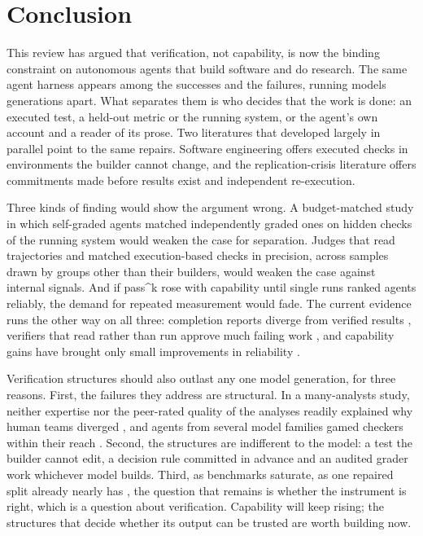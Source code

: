 \section{Conclusion}\label{sec:conclusion}

This review has argued that verification, not capability, is now the binding constraint on autonomous agents that build software and do research. The same agent harness appears among the successes and the failures, running models generations apart. What separates them is who decides that the work is done: an executed test, a held-out metric or the running system, or the agent's own account and a reader of its prose. Two literatures that developed largely in parallel point to the same repairs. Software engineering offers executed checks in environments the builder cannot change, and the replication-crisis literature offers commitments made before results exist and independent re-execution.

Three kinds of finding would show the argument wrong. A budget-matched study in which self-graded agents matched independently graded ones on hidden checks of the running system would weaken the case for separation. Judges that read trajectories and matched execution-based checks in precision, across samples drawn by groups other than their builders, would weaken the case against internal signals. And if pass\textasciicircum k rose with capability until single runs ranked agents reliably, the demand for repeated measurement would fade. The current evidence runs the other way on all three: completion reports diverge from verified results \citep{F20}, verifiers that read rather than run approve much failing work \citep{T18}, and capability gains have brought only small improvements in reliability \citep{F2}.

Verification structures should also outlast any one model generation, for three reasons. First, the failures they address are structural. In a many-analysts study, neither expertise nor the peer-rated quality of the analyses readily explained why human teams diverged \citep{R9}, and agents from several model families gamed checkers within their reach \citep{V3,V17}. Second, the structures are indifferent to the model: a test the builder cannot edit, a decision rule committed in advance and an audited grader work whichever model builds. Third, as benchmarks saturate, as one repaired split already nearly has \citep{C12}, the question that remains is whether the instrument is right, which is a question about verification. Capability will keep rising; the structures that decide whether its output can be trusted are worth building now.
